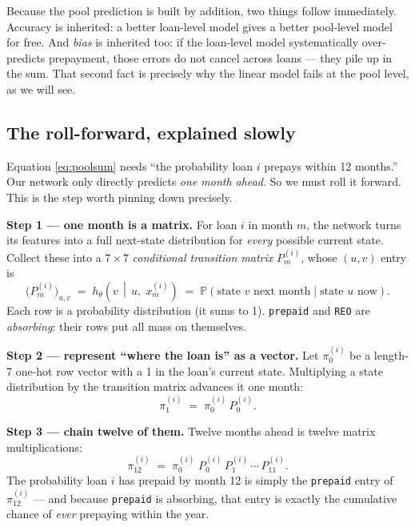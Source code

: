 \documentclass[11pt]{article}
\newcommand{\Prob}{\mathbb{P}}
\newcommand{\state}[1]{\texttt{#1}}
\begin{document}
\begin{intuition}
Because the pool prediction is built by addition, two things follow immediately. Accuracy is
inherited: a better loan-level model gives a better pool-level model for free. And
\emph{bias} is inherited too: if the loan-level model systematically over-predicts
prepayment, those errors do not cancel across loans --- they pile up in the sum. That second
fact is precisely why the linear model fails at the pool level, as we will see.
\end{intuition}

\subsection{The roll-forward, explained slowly}

Equation \eqref{eq:poolsum} needs ``the probability loan $i$ prepays within 12 months.'' Our
network only directly predicts \emph{one month ahead}. So we must roll it forward. This is the
step worth pinning down precisely.

\textbf{Step 1 --- one month is a matrix.} For loan $i$ in month $m$, the network turns its
features into a full next-state distribution for \emph{every} possible current state. Collect
these into a $7\times 7$ \emph{conditional transition matrix} $P^{(i)}_m$, whose $(u,v)$ entry
is
\[
  \bigl(P^{(i)}_m\bigr)_{u,v} \;=\; h_\theta\!\left(v \,\middle|\, u,\; x^{(i)}_m\right)
  \;=\; \Prob(\text{state } v \text{ next month} \mid \text{state } u \text{ now}).
\]
Each row is a probability distribution (it sums to 1). \state{prepaid} and \state{REO} are
\emph{absorbing}: their rows put all mass on themselves.

\textbf{Step 2 --- represent ``where the loan is'' as a vector.} Let $\pi^{(i)}_0$ be a
length-7 one-hot row vector with a 1 in the loan's current state. Multiplying a state
distribution by the transition matrix advances it one month:
\[
  \pi^{(i)}_{1} \;=\; \pi^{(i)}_0\, P^{(i)}_0 .
\]

\textbf{Step 3 --- chain twelve of them.} Twelve months ahead is twelve matrix multiplications:
\begin{equation}
  \pi^{(i)}_{12}
  \;=\; \pi^{(i)}_0 \; P^{(i)}_0\, P^{(i)}_1\, \cdots\, P^{(i)}_{11}.
  \label{eq:rollforward}
\end{equation}
The probability loan $i$ has prepaid by month 12 is simply the \state{prepaid} entry of
$\pi^{(i)}_{12}$ --- and because \state{prepaid} is absorbing, that entry is exactly the
cumulative chance of \emph{ever} prepaying within the year.
\end{document}

